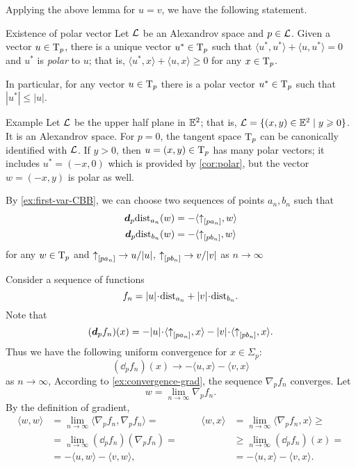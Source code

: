 Applying the above lemma for $u=v$, we have the following statement.

\begin{thm}{Existence of polar vector}\label{cor:polar}
Let $\mathcal{L}$ be an Alexandrov space 
and $p\in \mathcal{L}$. 
Given a vector $u\in \mathrm{T}_p$,  there is a unique vector $u^*\in\mathrm{T}_p$ such that $\langle u^*,u^*\rangle +\langle u,u^*\rangle = 0$ and
$u^*$ is \emph{polar} to $u$;
that is,
 $\langle u^*,x\rangle +\langle u,x\rangle \ge 0$ for any $x\in \mathrm{T}_p$.

In particular, for any vector $u\in \mathrm{T}_p$ there is a polar vector $u^*\in\mathrm{T}_p$ such that
$|u^*|\le |u|$.
\end{thm}

\begin{thm}{Example}
Let $\mathcal{L}$ be the upper half plane in $\mathbb{E}^2$;
that is, $\spc{L}\z=\{(x,y)\in \EE^2\mid y\ge 0\}$.
It is an Alexandrov space.
For $p=0$, the tangent space $\mathrm{T}_p$ can be canonically identified with $\mathcal{L}$.
If $y>0$, then $u=(x,y)\in \mathrm{T}_p$ has many polar vectors;
it includes $u^*=(-x,0)$ which is provided by \ref{cor:polar},
but the vector $w=(-x,y)$ is polar as well.
\end{thm}

By \ref{ex:first-var-CBB}, we can choose two sequences of points $a_n,b_n$ such that 
\begin{align*}
\bm{d}_p\mathrm{dist}_{a_n}(w)&=-\langle{\uparrow}_{[{p}{a_n}]},w\rangle
\\
\bm{d}_p\mathrm{dist}_{b_n}(w)&=-\langle{\uparrow}_{[{p}{b_n}]},w\rangle
\end{align*}
for any $w\in\mathrm{T}_p$ and ${\uparrow}_{[{p}{a_n}]}\to u/|u|$, ${\uparrow}_{[{p}{b_n}]}\to v/|v|$ as $n\to \infty$

Consider a sequence of functions 
\[f_n=|u|\cdot\distfun_{a_n}+|v|\cdot\distfun_{b_n}.\]
Note that 
\[(\dd_pf_n)(x)=-|u|\cdot\langle \dir{p}{a_n},x\rangle -|v|\cdot\langle \dir{p}{b_n},x\rangle .\]
Thus we have the following uniform convergence for $x\in\Sigma_p$:
\[(\dd_pf_n)(x)\to-\langle u,x\rangle -\langle v,x\rangle \]
as $n\to\infty$,
According to \ref{ex:convergence-grad}, 
the sequence $\nabla_pf_n$ converges.
Let 
\[w=\lim_{n\to\infty}\nabla_pf_n.\]
By the definition of gradient,
\[\begin{aligned}
\langle w,w\rangle &=\lim_{n\to\infty}\langle \nabla_pf_n,\nabla_pf_n\rangle =
&&&%
\langle w,x\rangle &=\lim_{n\to\infty}\langle \nabla_pf_n,x\rangle \ge
\\%
&=\lim_{n\to\infty}(\dd_p f_n)(\nabla_p f_n)
=
&&&%
&\ge
\lim_{n\to\infty}(\dd_pf_n)(x)
=
\\%
&=-\langle u,w\rangle -\langle v,w\rangle ,
&&&%
&=-\langle u,x\rangle -\langle v,x\rangle .
\end{aligned}\]
\qedsf












